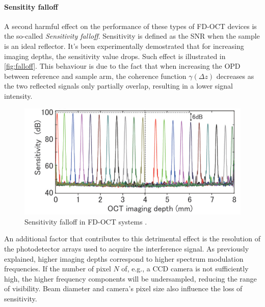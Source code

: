 \paragraph{Sensitity falloff}
A second harmful effect on the performance of these types of FD-OCT devices is the so-called \emph{Sensitivity falloff}. Sensitivity is defined as the \ac{SNR} when the sample is an ideal reflector. It's been experimentally demostrated that for increasing imaging depths, the sensitivity value drops. Such effect is illustrated in \autoref{fig:falloff}. This behaviour is due to the fact that when increasing the \ac{OPD} between reference and sample arm, the coherence function $\gamma(\Delta z)$ decreases as the two reflected signals only partially overlap, resulting in a lower signal intensity. 

\begin{figure}[bth]
	\myfloatalign
	\includegraphics[width=\linewidth]{gfx/ch2/falloff}
	\caption{Sensitivity falloff in \ac{FD-OCT} systems \cite{Choi2012}.}\label{fig:falloff}
\end{figure}


An additional factor that contributes to this detrimental effect is the resolution of the photodetector arrays used to acquire the interference signal. As previously explained, higher imaging depths correspond to higher spectrum modulation frequencies. If the number of pixel $N$ of, e.g., a \ac{CCD} camera is not sufficiently high, the higher frequency components will be undersampled, reducing the range of visibility. Beam diameter and camera's pixel size also influence the loss of sensitivity. 

